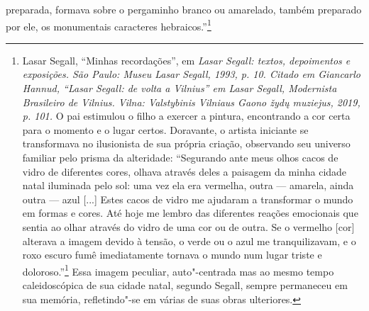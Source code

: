 preparada, formava sobre o pergaminho branco ou amarelado, também
preparado por ele, os monumentais caracteres hebraicos.''\footnote{Lasar Segall, ``Minhas recordações'', em \textit{Lasar Segall: textos, depoimentos
  e exposições. São Paulo: Museu Lasar Segall, 1993, p. 10. Citado em
  Giancarlo Hannud, ``Lasar Segall: de volta a Vilnius'' em \textit{Lasar
  Segall, Modernista Brasileiro de Vilnius}. Vilna: Valstybinis
  Vilniaus Gaono žydų muziejus, 2019, p. 101.} O pai estimulou o filho a
exercer a pintura, encontrando a cor certa para o momento e o lugar
certos. Doravante, o artista iniciante se transformava no ilusionista de
sua própria criação, observando seu universo familiar pelo prisma da
alteridade: ``Segurando ante meus olhos cacos de vidro de diferentes
cores, olhava através deles a paisagem da minha cidade natal iluminada
pelo sol: uma vez ela era vermelha, outra --- amarela, ainda outra ---
azul {[}...{]} Estes cacos de vidro me ajudaram a transformar o mundo em
formas e cores. Até hoje me lembro das diferentes reações emocionais que
sentia ao olhar através do vidro de uma cor ou de outra. Se o vermelho
{[}cor{]} alterava a imagem devido à tensão, o verde ou o azul me
tranquilizavam, e o roxo escuro fumê imediatamente tornava o mundo num
lugar triste e doloroso.''\footnote{Pietro Maria Bardi, \textit{Lasar
  Segall: Painter, Engraver, Sculptor}. Milão: Edizioni de Milione,
  1959, p. 17. Tradução para o português de Ieva Šadzevičienė, ``O
  litvak que levou o modernismo para o Brasil'' in \textit{Lasar Segall,
  Modernista Brasileiro de Vilnius.} Vilnius: Valstybinis Vilniaus Gaono
  žydų muziejus, 2019, p. 109.} Essa imagem peculiar, auto"-centrada mas
ao mesmo tempo caleidoscópica de sua cidade natal, segundo Segall,
sempre permaneceu em sua memória, refletindo"-se em várias de suas obras
ulteriores.

}
